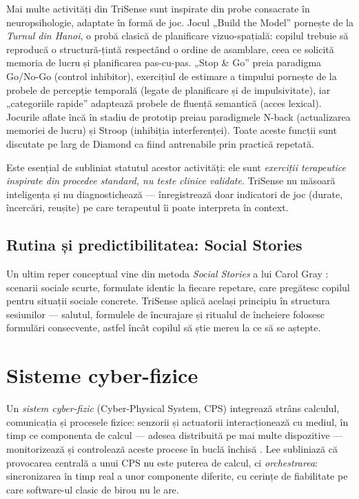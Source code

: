 Mai multe activități din TriSense sunt inspirate din probe consacrate în neuropsihologie, adaptate în formă de joc. Jocul „Build the Model” pornește de la \emph{Turnul din Hanoi}, o probă clasică de planificare vizuo-spațială: copilul trebuie să reproducă o structură-țintă respectând o ordine de asamblare, ceea ce solicită memoria de lucru și planificarea pas-cu-pas. „Stop \& Go” preia paradigma Go/No-Go (control inhibitor), exercițiul de estimare a timpului pornește de la probele de percepție temporală (legate de planificare și de impulsivitate), iar „categoriile rapide” adaptează probele de fluență semantică (acces lexical). Jocurile aflate încă în stadiu de prototip preiau paradigmele N-back (actualizarea memoriei de lucru) și Stroop (inhibiția interferenței). Toate aceste funcții sunt discutate pe larg de Diamond \cite{diamond2013} ca fiind antrenabile prin practică repetată.

Este esențial de subliniat statutul acestor activități: ele sunt \emph{exerciții terapeutice inspirate din procedee standard, nu teste clinice validate}. TriSense nu măsoară inteligența și nu diagnostichează — înregistrează doar indicatori de joc (durate, încercări, reușite) pe care terapeutul îi poate interpreta în context.

\subsection{Rutina și predictibilitatea: Social Stories}

Un ultim reper conceptual vine din metoda \emph{Social Stories} a lui Carol Gray \cite{gray2010}: scenarii sociale scurte, formulate identic la fiecare repetare, care pregătesc copilul pentru situații sociale concrete. TriSense aplică același principiu în structura sesiunilor — salutul, formulele de încurajare și ritualul de încheiere folosesc formulări consecvente, astfel încât copilul să știe mereu la ce să se aștepte.

\section{Sisteme cyber-fizice}

Un \emph{sistem cyber-fizic} (Cyber-Physical System, CPS) integrează strâns calculul, comunicația și procesele fizice: senzorii și actuatorii interacționează cu mediul, în timp ce componenta de calcul — adesea distribuită pe mai multe dispozitive — monitorizează și controlează aceste procese în buclă închisă \cite{lee2008}. Lee subliniază că provocarea centrală a unui CPS nu este puterea de calcul, ci \emph{orchestrarea}: sincronizarea în timp real a unor componente diferite, cu cerințe de fiabilitate pe care software-ul clasic de birou nu le are.

